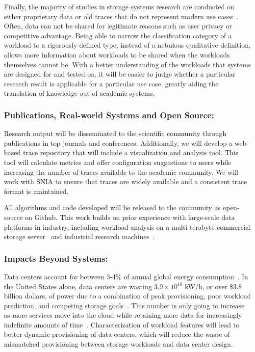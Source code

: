 Finally, the majority of studies in storage systems research are conducted on
either proprietary data or old traces that do not represent modern use
cases~\cite{avani-systor}.  Often, data can not be shared for legitimate reasons such as
user privacy or competitive advantage.  Being able to narrow the classification
category of a workload to a rigorously defined type, instead of a nebulous
qualitative definition, allows more information about workloads to be shared
when the workloads themselves cannot be.
With a better understanding of the workloads that systems are designed for and
tested on, it will be easier to judge whether a particular research result is
applicable for a particular use case, greatly aiding the translation of
knowledge out of academic systems.

\subsubsection*{Publications, Real-world Systems and Open Source: } 

Research output will be disseminated to the scientific community through
publications in top journals and conferences.  Additionally, we will develop a
web-based trace repository that will include a visualization and analysis tool. This tool will calculate metrics and
offer configuration suggestions to users while increasing the number
of traces available to the academic community.  We will work with SNIA to ensure that traces are widely available and a consistent trace format is maintained.

All algorithms and code developed will be released to the community as
open-source on Github.%
This work builds on prior experience with large-scale data platforms in industry, including workload
analysis on a multi-terabyte commercial storage server~\cite{hands} and
industrial research machines~\cite{avani-systor}.

\subsubsection*{Impacts Beyond Systems: }

Data centers account for between 3-4\% of annual global energy
consumption~\cite{nrdc}.  In the United States alone, data centers are wasting
$3.9\times10^{10}$ kW/h, or over \$3.8 billion dollars, of power due to a
combination of peak provisioning, poor workload prediction, and competing
storage goals~\cite{masanet,nrdc}.  This number is only going to increase as
more services move into the cloud while retaining more data for increasingly
indefinite amounts of time~\cite{nrdc,baker2006fresh}.  Characterization of workload
features will lead to better dynamic provisioning of data centers, which will
reduce the waste of mismatched provisioning between storage workloads and data
center design.  

